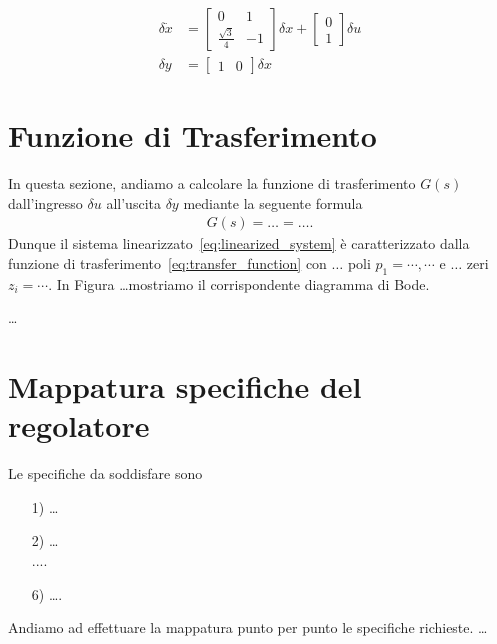 \documentclass[a4paper, 11pt]{article}
\begin{document}
\begin{subequations}
	\begin{align}
		\delta \dot x & = \begin{bmatrix}
			0 & 1 \\ \frac{\sqrt{3}}{4} & -1
		\end{bmatrix} \delta x + \begin{bmatrix}
			0 \\ 1
		\end{bmatrix} \delta u \\
		\delta y & = \begin{bmatrix}
			1 & 0
		\end{bmatrix} \delta x
	\end{align}
\end{subequations}

\section{Funzione di Trasferimento}

In questa sezione, andiamo a calcolare la funzione di trasferimento $G(s)$ dall'ingresso $\delta u$ all'uscita $\delta y$ mediante la seguente formula 
%
%
\begin{align}\label{eq:transfer_function}
G(s) = \dots = \dots.
\end{align}
%
Dunque il sistema linearizzato~\eqref{eq:linearized_system} è caratterizzato dalla funzione di trasferimento~\eqref{eq:transfer_function} con $\dots$ poli $p_1 = \cdots, \cdots$ e $\dots$ zeri $z_i =\cdots$. In Figura \dots mostriamo il corrispondente diagramma di Bode. 

\dots

\section{Mappatura specifiche del regolatore}
\label{sec:specifications}

Le specifiche da soddisfare sono
\begin{itemize}
	\item[1)] \dots\\
	\item[2)] \dots\\
	....\\
	\item[6)] \dots.
\end{itemize}
%
Andiamo ad effettuare la mappatura punto per punto le specifiche richieste. \dots  
\end{document}
